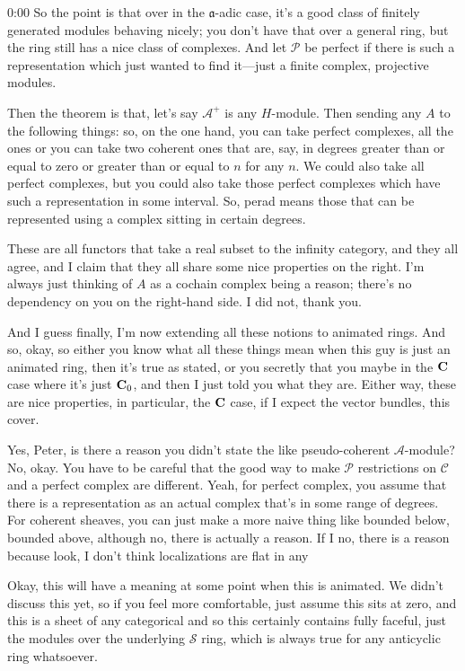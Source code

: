 \begin{unfinished}{0:00}
So the point is that over in the $\mathfrak{a}$-adic case, it's a good class of finitely generated modules behaving nicely; you don't have that over a general ring, but the ring still has a nice class of complexes. And let $\mathcal{P}$ be perfect if there is such a representation which just wanted to find it---just a finite complex, projective modules.

Then the theorem is that, let's say $\mathcal{A}^+$ is any $H$-module. Then sending any $A$ to the following things: so, on the one hand, you can take perfect complexes, all the ones or you can take two coherent ones that are, say, in degrees greater than or equal to zero or greater than or equal to $n$ for any $n$. We could also take all perfect complexes, but you could also take those perfect complexes which have such a representation in some interval. So, perad means those that can be represented using a complex sitting in certain degrees.

These are all functors that take a real subset to the infinity category, and they all agree, and I claim that they all share some nice properties on the right. I'm always just thinking of $A$ as a cochain complex being a reason; there's no dependency on you on the right-hand side. I did not, thank you.

And I guess finally, I'm now extending all these notions to animated rings. And so, okay, so either you know what all these things mean when this guy is just an animated ring, then it's true as stated, or you secretly that you maybe in the $\mathbf C$ case where it's just $\mathbf C_0$, and then I just told you what they are. Either way, these are nice properties, in particular, the $\mathbf C$ case, if I expect the vector bundles, this cover.

Yes, Peter, is there a reason you didn't state the like pseudo-coherent $\mathcal{A}$-module? No, okay. You have to be careful that the good way to make $\mathcal{P}$ restrictions on $\mathcal{C}$ and a perfect complex are different. Yeah, for perfect complex, you assume that there is a representation as an actual complex that's in some range of degrees. For coherent sheaves, you can just make a more naive thing like bounded below, bounded above, although no, there is actually a reason. If I no, there is a reason because look, I don't think localizations are flat in any

Okay, this will have a meaning at some point when this is animated. We didn't discuss this yet, so if you feel more comfortable, just assume this sits at zero, and this is a sheet of any categorical and so this certainly contains fully faceful, just the modules over the underlying $\mathcal{S}$ ring, which is always true for any anticyclic ring whatsoever.


\end{unfinished}
